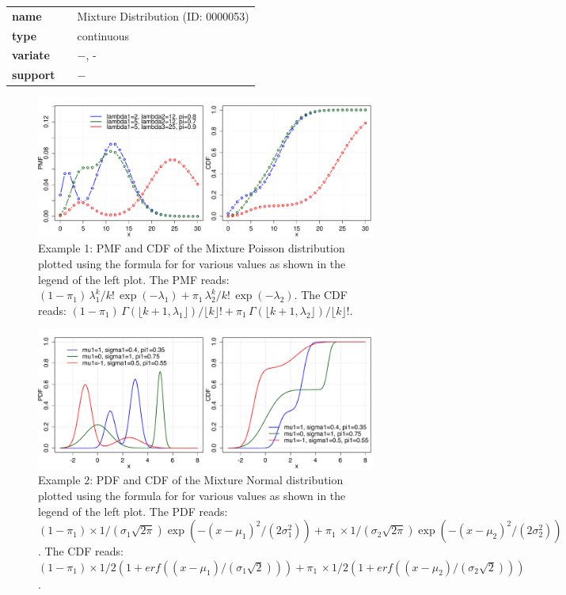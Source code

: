   \bigskip 

\begin{tabular}{p{2cm}cl}
\textbf{name} & & Mixture Distribution (ID: 0000053)\\ 
 
\textbf{type} & & continuous \\ 

\textbf{variate} & & $-$, - \\ 

\textbf{support} & & $-$
\end{tabular}

\begin{figure}[htb!]
\centering
  \includegraphics[width=140mm]{pics/MixturePoisson.pdf}
 \caption{Example 1: PMF and CDF of the Mixture Poisson distribution plotted using the formula for 
 for various values as shown in the legend of the left plot. The PMF reads: $(1\!-\!\pi_1) \,\lambda_1^k/k! \,\exp(-\lambda_1) + \pi_1\,\lambda_2^k / k! \, \exp(-\lambda_2)$. The CDF reads: $(1-\pi_1)\,\Gamma(\lfloor k+1 , \lambda_1 \rfloor) / \lfloor k \rfloor!+\pi_1 \,\Gamma(\lfloor k+1 , \lambda_2 \rfloor) / \lfloor k \rfloor!$.}
 \label{fig:MixturePoisson_pmf_cdf}
\end{figure}
\begin{figure}[htb!]
\centering
  \includegraphics[width=140mm]{pics/MixtureNormal.pdf}
 \caption{Example 2: PDF and CDF of the Mixture Normal distribution plotted using the formula for 
 for various values as shown in the legend of the left plot. The PDF reads: $(1\!-\!\pi_1)\times1/(\sigma_1\sqrt{2\pi})\exp(-(x-\mu_1)^2/(2\sigma_1^2)) + \pi_1\,\times1/(\sigma_2\sqrt{2\pi})\exp(-(x-\mu_2)^2/(2\sigma_2^2))$. The CDF reads: $(1\!-\!\pi_1)\times1/2 (1 + erf((x-\mu_1)/(\sigma_1\sqrt{2})))  + \pi_1\,\times1/2  (1 + erf((x-\mu_2)/(\sigma_2\sqrt{2})))$.}
 \label{fig:MixtureNormal_pdf_cdf}
\end{figure}

